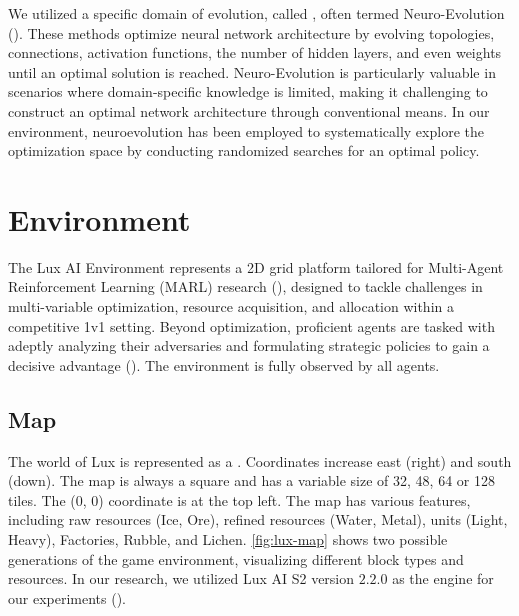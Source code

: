 \bigskip

\noindent We utilized a specific domain of evolution, called , often termed Neuro-Evolution (\textcolor{deepblue}{\cite{Galvan_2021}}). These methods optimize neural network architecture by evolving topologies, connections, activation functions, the number of hidden layers, and even weights until an optimal solution is reached. Neuro-Evolution is particularly valuable in scenarios where domain-specific knowledge is limited, making it challenging to construct an optimal network architecture through conventional means. In our environment, neuroevolution has been employed to systematically explore the optimization space by conducting randomized searches for an optimal policy.

\section{Environment} \label{sec:env}
\label{sec:environment}

\noindent The Lux AI Environment represents a 2D grid platform tailored for Multi-Agent Reinforcement Learning (MARL) research (\cite{chen2023emergent}), designed to tackle challenges in multi-variable optimization, resource acquisition, and allocation within a competitive 1v1 setting. Beyond optimization, proficient agents are tasked with adeptly analyzing their adversaries and formulating strategic policies to gain a decisive advantage (\textcolor{deepblue}{\cite{lux-ai-season-2}}). The environment is fully observed by all agents.

\subsection{Map}

\noindent The world of Lux is represented as a . Coordinates increase east (right) and south (down). The map is always a square and has a variable size of 32, 48, 64 or 128 tiles. The (0, 0) coordinate is at the top left. The map has various features, including raw resources (Ice, Ore), refined resources (Water, Metal), units (Light, Heavy), Factories, Rubble, and Lichen. \textcolor{deepblue}{\autoref{fig:lux-map}} shows two possible generations of the game environment, visualizing different block types and resources. In our research, we utilized Lux AI S2 version $2.2.0$ as the engine for our experiments (\textcolor{deepblue}{\cite{luxais2_neurips_23}}).



